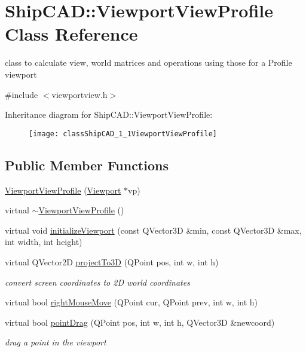 \hypertarget{classShipCAD_1_1ViewportViewProfile}{}\section{Ship\+C\+AD\+:\+:Viewport\+View\+Profile Class Reference}
\label{classShipCAD_1_1ViewportViewProfile}


class to calculate view, world matrices and operations using those for a Profile viewport  




{\ttfamily \#include $<$viewportview.\+h$>$}

Inheritance diagram for Ship\+C\+AD\+:\+:Viewport\+View\+Profile\+:\begin{figure}[H]
\begin{center}
\leavevmode
\texttt{[image: classShipCAD\_1\_1ViewportViewProfile]}
\end{center}
\end{figure}
\subsection*{Public Member Functions}
\begin{DoxyCompactItemize}
\item 
\hyperlink{classShipCAD_1_1ViewportViewProfile_aff06a8bee0af9b969e4dc7373871700e}{Viewport\+View\+Profile} (\hyperlink{classShipCAD_1_1Viewport}{Viewport} $\ast$vp)
\item 
virtual \hyperlink{classShipCAD_1_1ViewportViewProfile_a1c3101fa8a458cf3908cd865349ace08}{$\sim$\+Viewport\+View\+Profile} ()
\item 
virtual void \hyperlink{classShipCAD_1_1ViewportViewProfile_ae8ac602b7c67fddbfce7ceeda85676b3}{initialize\+Viewport} (const Q\+Vector3D \&min, const Q\+Vector3D \&max, int width, int height)
\item 
virtual Q\+Vector2D \hyperlink{classShipCAD_1_1ViewportViewProfile_a6158e95a906d0b62064e72ead2263a73}{project\+To3D} (Q\+Point pos, int w, int h)
\begin{DoxyCompactList}\small\item\em convert screen coordinates to 2D world coordinates \end{DoxyCompactList}\item 
virtual bool \hyperlink{classShipCAD_1_1ViewportViewProfile_a8fccdc2ff4cb6021b6e810712d45b8f0}{right\+Mouse\+Move} (Q\+Point cur, Q\+Point prev, int w, int h)
\item 
virtual bool \hyperlink{classShipCAD_1_1ViewportViewProfile_abc8adc37b3539da20124a9d1930cfc92}{point\+Drag} (Q\+Point pos, int w, int h, Q\+Vector3D \&newcoord)
\begin{DoxyCompactList}\small\item\em drag a point in the viewport \end{DoxyCompactList}\end{DoxyCompactItemize}
